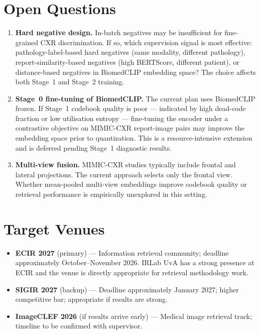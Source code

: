 \documentclass[11pt,a4paper]{article}
\begin{document}
\section{Open Questions}
\label{sec:open}

\begin{enumerate}[itemsep=6pt]

    \item \textbf{Hard negative design.}
    In-batch negatives may be insufficient for fine-grained CXR discrimination.
    If so, which supervision signal is most effective: pathology-label-based
    hard negatives (same modality, different pathology), report-similarity-based
    negatives (high BERTScore, different patient), or distance-based negatives
    in BiomedCLIP embedding space?
    The choice affects both Stage~1 and Stage~2 training.

    \item \textbf{Stage~0 fine-tuning of BiomedCLIP.}
    The current plan uses BiomedCLIP frozen.
    If Stage~1 codebook quality is poor --- indicated by high dead-code fraction
    or low utilisation entropy --- fine-tuning the encoder under a
    contrastive objective on MIMIC-CXR report-image pairs may improve the
    embedding space prior to quantization.
    This is a resource-intensive extension and is deferred pending Stage~1
    diagnostic results.

    \item \textbf{Multi-view fusion.}
    MIMIC-CXR studies typically include frontal and lateral projections.
    The current approach selects only the frontal view.
    Whether mean-pooled multi-view embeddings improve codebook quality or
    retrieval performance is empirically unexplored in this setting.

\end{enumerate}

\section{Target Venues}

\begin{itemize}[itemsep=4pt]
    \item \textbf{ECIR 2027} (primary) --- Information retrieval community;
    deadline approximately October--November 2026.
    IRLab UvA has a strong presence at ECIR and the venue is directly
    appropriate for retrieval methodology work.
    \item \textbf{SIGIR 2027} (backup) --- Deadline approximately
    January 2027; higher competitive bar; appropriate if results are strong.
    \item \textbf{ImageCLEF 2026} (if results arrive early) --- Medical image
    retrieval track; timeline to be confirmed with supervisor.
\end{itemize}
\end{document}
